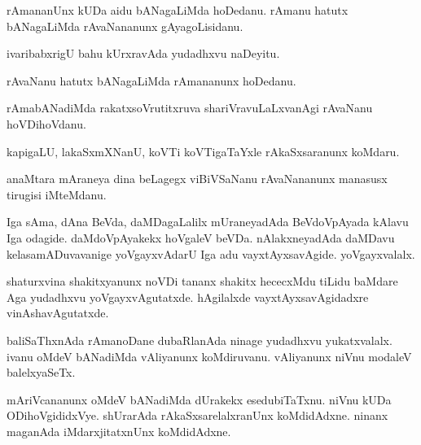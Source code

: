 \documentclass{article}
\begin{document}
\begin{mn}
rAmananUnx  kUDa  aidu  bANagaLiMda  hoDedanu.  rAmanu  hatutx  bANagaLiMda  rAvaNananunx  gAyagoLisidanu.
\end{mn}

\begin{mn}
ivaribabxrigU  bahu  kUrxravAda  yudadhxvu  naDeyitu.
\end{mn}

\begin{mn}
rAvaNanu  hatutx  bANagaLiMda  rAmananunx  hoDedanu.
\end{mn}

\begin{mn}
rAmabANadiMda  rakatxsoVrutitxruva  shariVravuLaLxvanAgi  rAvaNanu  hoVDihoVdanu.
\end{mn}

\begin{mn}
kapigaLU,  lakaSxmXNanU,  koVTi koVTigaTaYxle  rAkaSxsaranunx  koMdaru.
\end{mn}

\begin{mn}
anaMtara  mAraneya  dina  beLagegx  viBiVSaNanu  rAvaNananunx  manasusx  tirugisi  iMteMdanu.
\end{mn}

\begin{mn}
Iga	 sAma,  dAna  BeVda,  daMDagaLalilx  mUraneyadAda  BeVdoVpAyada  kAlavu  Iga  odagide.  daMdoVpAyakekx  hoVgaleV  beVDa.  
nAlakxneyadAda  daMDavu  kelasamADuvavanige  yoVgayxvAdarU  Iga  adu  vayxtAyxsavAgide.  yoVgayxvalalx.
\end{mn}

\begin{mn}
shaturxvina  shakitxyanunx  noVDi  tananx  shakitx  hececxMdu  tiLidu  baMdare  Aga  yudadhxvu  yoVgayxvAgutatxde.  hAgilalxde  
vayxtAyxsavAgidadxre  vinAshavAgutatxde.
\end{mn}

\begin{mn}
baliSaThxnAda  rAmanoDane  dubaRlanAda  ninage  yudadhxvu  yukatxvalalx.  ivanu  oMdeV  bANadiMda  vAliyanunx  koMdiruvanu.  
vAliyanunx  niVnu  modaleV  balelxyaSeTx.  
\end{mn}

\begin{mn}
mAriVcananunx  oMdeV  bANadiMda  dUrakekx  esedubiTaTxnu.  niVnu  kUDa  ODihoVgididxVye.  shUrarAda  rAkaSxsarelalxranUnx  
koMdidAdxne.  ninanx  maganAda  iMdarxjitatxnUnx  koMdidAdxne.
\end{mn}
\end{document}
